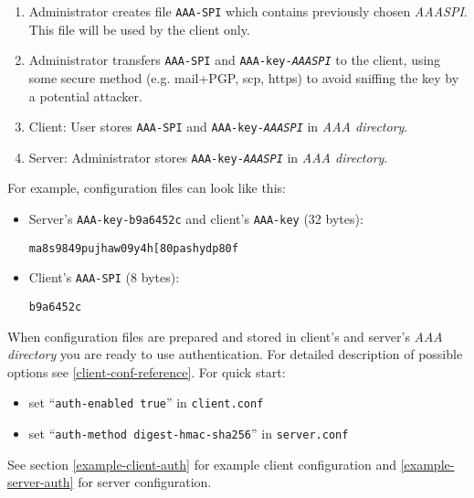 \begin{enumerate}
\begin{enumerate}
\item Administrator creates file \texttt{AAA-SPI} which contains
  previously chosen \textit{AAASPI}. This file will be used by the
  client only.

\item Administrator transfers \texttt{AAA-SPI} and
  \texttt{AAA-key-\textit{AAASPI}} to the client, using some secure
  method (e.g. mail+PGP, scp, https) to avoid sniffing the key by a
  potential attacker.

\item Client: User stores \texttt{AAA-SPI} and
  \texttt{AAA-key-\textit{AAASPI}} in \textit{AAA directory}.

\item Server: Administrator stores \texttt{AAA-key-\textit{AAASPI}} in
  \textit{AAA directory}.

\end{enumerate}

For example, configuration files can look like this:

\begin{itemize}
\item Server's \texttt{AAA-key-b9a6452c} and client's \texttt{AAA-key}
  (32 bytes):
\begin{lstlisting}
ma8s9849pujhaw09y4h[80pashydp80f
\end{lstlisting}

\item Client's \texttt{AAA-SPI} (8 bytes):
\begin{lstlisting}
b9a6452c
\end{lstlisting}
\end{itemize}

When configuration files are prepared and stored in client's and
server's \textit{AAA directory} you are ready to use
authentication. For detailed description of possible options see
\ref{client-conf-reference}. For quick start:
\begin{itemize}
 \item set ``\texttt{auth-enabled true}'' in \texttt{client.conf}

 \item set ``\texttt{auth-method digest-hmac-sha256}'' in
   \texttt{server.conf}

\end{itemize}

See section \ref{example-client-auth} for example client configuration
and \ref{example-server-auth} for server configuration.


\end{enumerate}
